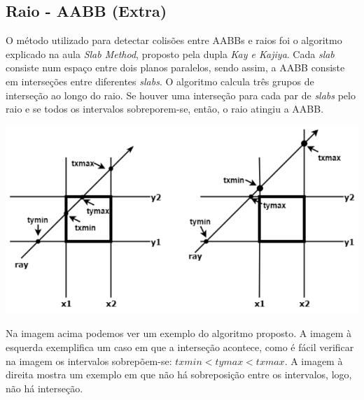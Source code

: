 \documentclass{article}
\begin{document}
    \subsection*{Raio - AABB (Extra)}
        \par
        O método utilizado para detectar colisões entre AABBs e raios foi o algoritmo explicado na aula \textit{Slab Method}, proposto pela dupla \textit{Kay e Kajiya}.
        Cada \textit{slab} consiste num espaço entre dois planos paralelos, sendo assim, a AABB consiste em interseções entre diferentes \textit{slabs}.
        O algoritmo calcula três grupos de interseção ao longo do raio. Se houver uma interseção para cada par de \textit{slabs} pelo raio e se todos os intervalos sobreporem-se, então, o raio atingiu a AABB.
        \begin{center}
            \includegraphics[scale=0.40]{slab}
        \end{center}
        \par
        Na imagem acima podemos ver um exemplo do algoritmo proposto. A imagem à esquerda exemplifica um caso em que a interseção acontece, como é fácil verificar na imagem os intervalos sobrepõem-se: $txmin < tymax < txmax$. A imagem à direita mostra um exemplo em que não há sobreposição entre os intervalos, logo, não há interseção.
\end{document}
